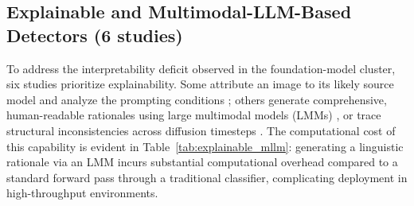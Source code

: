 \documentclass[sn-mathphys-num,Numbered,pdflatex]{sn-jnl}
\begin{document}
\subsection{Explainable and Multimodal-LLM-Based Detectors (6 studies)}
To address the interpretability deficit observed in the foundation-model cluster, six studies prioritize explainability. Some attribute an image to its likely source model and analyze the prompting conditions \cite{DefakeDetection12}; others generate comprehensive, human-readable rationales using large multimodal models (LMMs) \cite{AigiholmesTowards13,SpotThe58}, or trace structural inconsistencies across diffusion timesteps \cite{ExplainableSynthetic59}. The computational cost of this capability is evident in Table~\ref{tab:explainable_mllm}: generating a linguistic rationale via an LMM incurs substantial computational overhead compared to a standard forward pass through a traditional classifier, complicating deployment in high-throughput environments.
\end{document}
